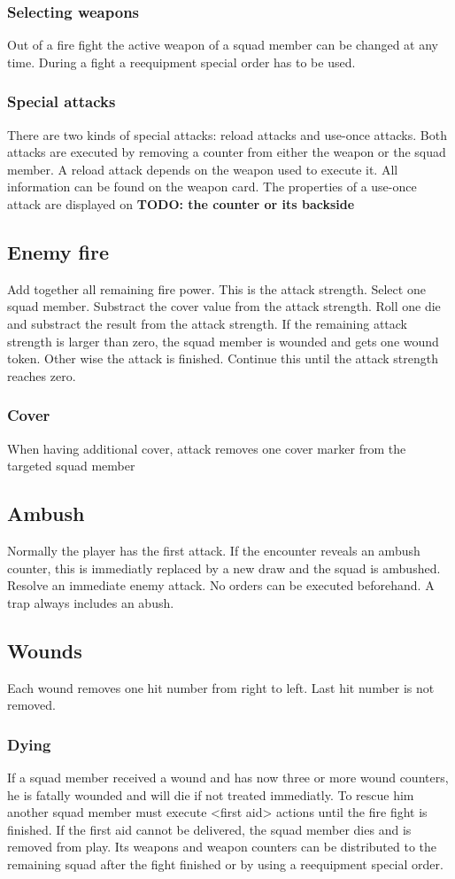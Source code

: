 \documentclass[twocolumn,titlepage]{article}
\begin{document}
\subsubsection{Selecting weapons}
Out of a fire fight the active weapon of a squad member can be changed at any time. During a fight a reequipment special order has to be used.
\subsubsection{Special attacks}
There are two kinds of special attacks: reload attacks and use-once attacks. Both attacks are executed by removing a counter from either the weapon or the squad member. A reload attack depends on the weapon used to execute it. All information can be found on the weapon card. The properties of a use-once attack are displayed on {\bf TODO: the counter or its backside}
\subsection{Enemy fire}
Add together all remaining fire power. This is the attack strength. Select one squad member. Substract the cover value from the attack strength. Roll one die and substract the result from the attack strength. If the remaining attack strength is larger than zero, the squad member is wounded and gets one wound token. Other wise the attack is finished. Continue this until the attack strength reaches zero.
\subsubsection{Cover}
When having additional cover, attack removes one cover marker from the targeted squad member
\subsection{Ambush}
Normally the player has the first attack. If the encounter reveals an ambush counter, this is immediatly replaced by a new draw and the squad is ambushed. Resolve an immediate enemy attack. No orders can be executed beforehand. A trap always includes an abush.
\subsection{Wounds}
Each wound removes one hit number from right to left. Last hit number is not removed.
\subsubsection{Dying}
If a squad member received a wound and has now three or more wound counters, he is fatally wounded and will die if not treated immediatly. To rescue him another squad member must execute <first aid> actions until the fire fight is finished. If the first aid cannot be delivered, the squad member dies and is removed from play. Its weapons and weapon counters can be distributed to the remaining squad after the fight finished or by using a reequipment special order.
\end{document}
